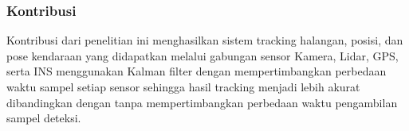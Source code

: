 \begin{frame}
    \frametitle{Kontribusi}

    \justifying
    Kontribusi dari penelitian ini menghasilkan sistem tracking halangan, posisi, dan pose kendaraan yang didapatkan melalui gabungan sensor Kamera, Lidar, GPS, serta INS menggunakan Kalman filter dengan mempertimbangkan perbedaan waktu sampel setiap sensor sehingga hasil tracking menjadi lebih akurat dibandingkan dengan tanpa mempertimbangkan perbedaan waktu pengambilan sampel deteksi.


\end{frame}